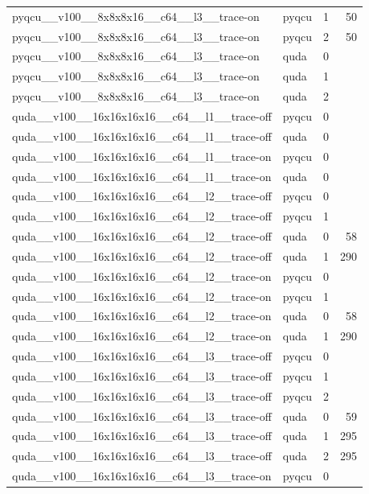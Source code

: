 \begin{table}[htbp]
\begin{tabular}{@{}llrr@{}}
pyqcu\_\_v100\_\_8x8x8x16\_\_c64\_\_l3\_\_trace-on & pyqcu & 1 & 50 \\
pyqcu\_\_v100\_\_8x8x8x16\_\_c64\_\_l3\_\_trace-on & pyqcu & 2 & 50 \\
pyqcu\_\_v100\_\_8x8x8x16\_\_c64\_\_l3\_\_trace-on & quda & 0 &  \\
pyqcu\_\_v100\_\_8x8x8x16\_\_c64\_\_l3\_\_trace-on & quda & 1 &  \\
pyqcu\_\_v100\_\_8x8x8x16\_\_c64\_\_l3\_\_trace-on & quda & 2 &  \\
quda\_\_v100\_\_16x16x16x16\_\_c64\_\_l1\_\_trace-off & pyqcu & 0 &  \\
quda\_\_v100\_\_16x16x16x16\_\_c64\_\_l1\_\_trace-off & quda & 0 &  \\
quda\_\_v100\_\_16x16x16x16\_\_c64\_\_l1\_\_trace-on & pyqcu & 0 &  \\
quda\_\_v100\_\_16x16x16x16\_\_c64\_\_l1\_\_trace-on & quda & 0 &  \\
quda\_\_v100\_\_16x16x16x16\_\_c64\_\_l2\_\_trace-off & pyqcu & 0 &  \\
quda\_\_v100\_\_16x16x16x16\_\_c64\_\_l2\_\_trace-off & pyqcu & 1 &  \\
quda\_\_v100\_\_16x16x16x16\_\_c64\_\_l2\_\_trace-off & quda & 0 & 58 \\
quda\_\_v100\_\_16x16x16x16\_\_c64\_\_l2\_\_trace-off & quda & 1 & 290 \\
quda\_\_v100\_\_16x16x16x16\_\_c64\_\_l2\_\_trace-on & pyqcu & 0 &  \\
quda\_\_v100\_\_16x16x16x16\_\_c64\_\_l2\_\_trace-on & pyqcu & 1 &  \\
quda\_\_v100\_\_16x16x16x16\_\_c64\_\_l2\_\_trace-on & quda & 0 & 58 \\
quda\_\_v100\_\_16x16x16x16\_\_c64\_\_l2\_\_trace-on & quda & 1 & 290 \\
quda\_\_v100\_\_16x16x16x16\_\_c64\_\_l3\_\_trace-off & pyqcu & 0 &  \\
quda\_\_v100\_\_16x16x16x16\_\_c64\_\_l3\_\_trace-off & pyqcu & 1 &  \\
quda\_\_v100\_\_16x16x16x16\_\_c64\_\_l3\_\_trace-off & pyqcu & 2 &  \\
quda\_\_v100\_\_16x16x16x16\_\_c64\_\_l3\_\_trace-off & quda & 0 & 59 \\
quda\_\_v100\_\_16x16x16x16\_\_c64\_\_l3\_\_trace-off & quda & 1 & 295 \\
quda\_\_v100\_\_16x16x16x16\_\_c64\_\_l3\_\_trace-off & quda & 2 & 295 \\
quda\_\_v100\_\_16x16x16x16\_\_c64\_\_l3\_\_trace-on & pyqcu & 0 &  \\

\end{tabular}
\end{table}
